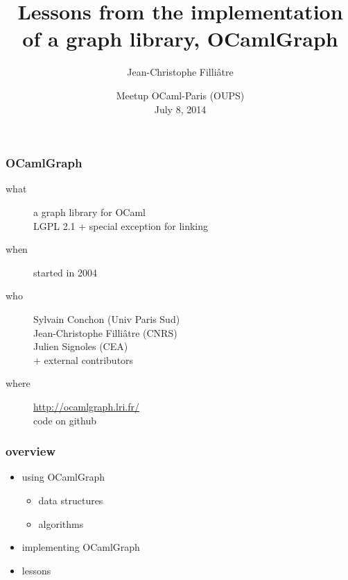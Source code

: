 \documentclass{beamer}
\title{Lessons from the implementation of a graph library, OCamlGraph}
\author{Jean-Christophe Filli\^atre}
\institute{CNRS}
\date{Meetup OCaml-Paris (OUPS) \\ July 8, 2014}
\begin{document}
\addtocounter{framenumber}{-1}

\maketitle


\begin{frame}\frametitle{OCamlGraph}

  \begin{description}
  \item[what] a graph library for OCaml \\
    LGPL 2.1 + special exception for linking

    \bigskip
    \item[when]
      started in 2004

    \bigskip
  \item[who] Sylvain Conchon (Univ Paris Sud) \\
    Jean-Christophe Filliâtre (CNRS) \\
    Julien Signoles (CEA) \\
    + external contributors

    \bigskip
    \item[where]
    \url{http://ocamlgraph.lri.fr/} \\
    code on github
  \end{description}
\end{frame}

\begin{frame}\frametitle{overview}
  \begin{itemize}
  \item using OCamlGraph
    \begin{itemize}
    \item data structures
    \item algorithms
    \end{itemize}
    \vskip15pt
  \item implementing OCamlGraph
    \vskip15pt
  \item lessons
  \end{itemize}
\end{frame}


\end{document}
